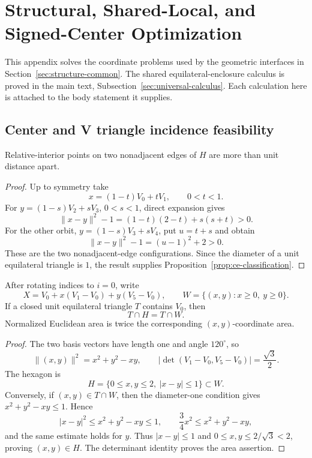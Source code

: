 \section[Structural and Signed-Center Optimization]
{Structural, Shared-Local, and Signed-Center Optimization}
\label{app:structural-shared-local-signed-center}

This appendix solves the coordinate problems used by the
geometric interfaces in Section~\ref{sec:structure-common}.  The shared equilateral-enclosure calculus is proved in the main text,
Subsection~\ref{sec:universal-calculus}. Each calculation here is attached
to the body statement it supplies.

\subsection{Center and V triangle incidence feasibility}

\begin{lemma}
\label{lem:app-center-edge-separation}
Relative-interior points on two nonadjacent edges of $H$ are more than unit
distance apart.
\end{lemma}

\begin{proof}
Up to symmetry take
\[
 x=(1-t)V_0+tV_1,\qquad 0<t<1.
\]
For $y=(1-s)V_2+sV_3$, $0<s<1$, direct expansion gives
\[
 \lVert x-y\rVert^2-1=(1-t)(2-t)+s(s+t)>0.
\]
For the other orbit, $y=(1-s)V_3+sV_4$, put $u=t+s$ and obtain
\[
 \lVert x-y\rVert^2-1=(u-1)^2+2>0.
\]
These are the two nonadjacent-edge configurations.  Since the diameter of a
unit equilateral triangle is $1$, the result supplies
Proposition~\ref{prop:ce-classification}.
\end{proof}

\begin{lemma}
\label{lem:shared-corner-chart}
After rotating indices to $i=0$, write
\[
 X=V_0+x(V_1-V_0)+y(V_5-V_0),
 \qquad W=\{(x,y):x\ge0,\ y\ge0\}.
\]
If a closed unit equilateral triangle $T$ contains $V_0$, then
\[
 T\cap H=T\cap W.
\]
Normalized Euclidean area is twice the corresponding $(x,y)$-coordinate
area.
\end{lemma}

\begin{proof}
The two basis vectors have length one and angle $120^\circ$, so
\[
 \lVert(x,y)\rVert^2=x^2+y^2-xy,
 \qquad
 \left\lvert\det(V_1-V_0,V_5-V_0)\right\rvert=\frac{\sqrt3}{2}.
\]
The hexagon is
\[
 H=\{0\le x,y\le2,\ |x-y|\le1\}\subset W.
\]
Conversely, if $(x,y)\in T\cap W$, then the diameter-one condition gives
$x^2+y^2-xy\le1$.  Hence
\[
 |x-y|^2\le x^2+y^2-xy\le1,
 \qquad
 \frac34x^2\le x^2+y^2-xy,
\]
and the same estimate holds for $y$.  Thus $|x-y|\le1$ and
$0\le x,y\le2/\sqrt3<2$, proving $(x,y)\in H$.  The determinant identity
proves the area assertion.
\end{proof}

